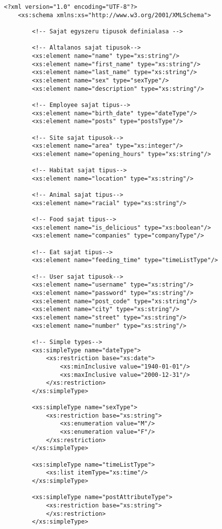 \documentclass[12pt]{report}
\begin{document}
\begin{lstlisting}[caption={Az XSD dokumentum}]
<?xml version="1.0" encoding="UTF-8"?>
	<xs:schema xmlns:xs="http://www.w3.org/2001/XMLSchema">
	
		<!-- Sajat egyszeru tipusok definialasa -->
		
		<!-- Altalanos sajat tipusok-->
		<xs:element name="name" type="xs:string"/>
		<xs:element name="first_name" type="xs:string"/>
		<xs:element name="last_name" type="xs:string"/>
		<xs:element name="sex" type="sexType"/>
		<xs:element name="description" type="xs:string"/>
		
		<!-- Employee sajat tipus-->
		<xs:element name="birth_date" type="dateType"/>
		<xs:element name="posts" type="postsType"/>
		
		<!-- Site sajat tipusok-->
		<xs:element name="area" type="xs:integer"/>
		<xs:element name="opening_hours" type="xs:string"/>
		
		<!-- Habitat sajat tipus-->
		<xs:element name="location" type="xs:string"/>
		
		<!-- Animal sajat tipus-->
		<xs:element name="racial" type="xs:string"/>
		
		<!-- Food sajat tipus-->
		<xs:element name="is_delicious" type="xs:boolean"/>
		<xs:element name="companies" type="companyType"/>
		
		<!-- Eat sajat tipus-->
		<xs:element name="feeding_time" type="timeListType"/>
		
		<!-- User sajat tipusok-->
		<xs:element name="username" type="xs:string"/>
		<xs:element name="password" type="xs:string"/>
		<xs:element name="post_code" type="xs:string"/>
		<xs:element name="city" type="xs:string"/>
		<xs:element name="street" type="xs:string"/>
		<xs:element name="number" type="xs:string"/>
		
		<!-- Simple types-->
		<xs:simpleType name="dateType">
			<xs:restriction base="xs:date">
				<xs:minInclusive value="1940-01-01"/>
				<xs:maxInclusive value="2000-12-31"/>
			</xs:restriction>
		</xs:simpleType>
		
		<xs:simpleType name="sexType">
			<xs:restriction base="xs:string">
				<xs:enumeration value="M"/>
				<xs:enumeration value="F"/>
			</xs:restriction>
		</xs:simpleType>
		
		<xs:simpleType name="timeListType">
			<xs:list itemType="xs:time"/>
		</xs:simpleType>
		
		<xs:simpleType name="postAttributeType">
			<xs:restriction base="xs:string">
			</xs:restriction>
		</xs:simpleType>
		

\end{lstlisting}
\end{document}
